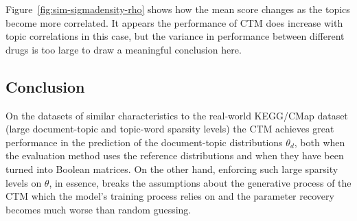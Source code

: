 \documentclass[12pt,a4paper,twoside,openright]{report}
\begin{document}
Figure~\ref{fig:sim-sigmadensity-rho} shows how the mean score changes as the topics become more correlated. It appears the performance of CTM does increase with topic correlations in this case, but the variance in performance between different drugs is too large to draw a meaningful conclusion here.

%

\subsection{Conclusion}

On the datasets of similar characteristics to the real-world KEGG/CMap dataset (large document-topic and topic-word sparsity levels) the CTM achieves great performance in the prediction of the document-topic distributions $\theta_d$, both when the evaluation method uses the reference distributions and when they have been turned into Boolean matrices. On the other hand, enforcing such large sparsity levels on $\theta$, in essence, breaks the assumptions about the generative process of the CTM which the model's training process relies on and the parameter recovery becomes much worse than random guessing.
\end{document}
